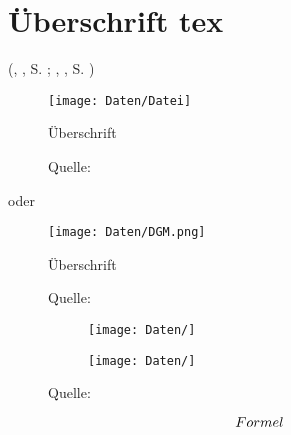
\section[Überschrift]{\texorpdfstring{Überschrift tex}{Überschrift pdf}}


\textcolor{HCU}{}
\textcolor{red1}{}




(\citeauthor{}, \citeyearNP{}, S. ; \citeauthor{}, \citeyearNP{}, S. )


\begin{figure}[H]
	\centering
	\texttt{[image: Daten/Datei]}
	\caption{Überschrift}
	\caption*{Quelle: \citeA{}}
	\label{fig:}
\end{figure}

oder



\begin{figure}[H]
	\centering
	\texttt{[image: Daten/DGM.png]}
	\caption{Überschrift}
	\caption*{Quelle: \citeA{}}
	\label{fig:}
\end{figure}


\begin{figure}[H]
	\begin{subfigure}[c]{0.48\textwidth}
		\texttt{[image: Daten/]}
		\subcaption{}
		\label{fig:}
	\end{subfigure}
	\hfill
	\begin{subfigure}[c]{0.48\textwidth}
		\texttt{[image: Daten/]}
		\subcaption{}
		\label{fig:}
	\end{subfigure}
	\caption{}
	\caption*{Quelle: \citeA[]{}}
	\label{fig:}
\end{figure}


\begin{equation}
	\numberwithin{equation}{section}
	Formel \label{eq:Label} \\
\end{equation}





